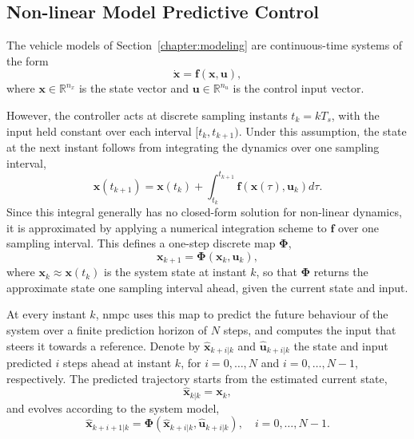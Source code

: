 \subsection{Non-linear Model Predictive Control}
\label{sec:ctrl_nmpc_principles}

The vehicle models of Section~\ref{chapter:modeling} are continuous-time systems of the form
\begin{equation}
    \dot{\mathbf{x}} = \mathbf{f}\left( \mathbf{x}, \mathbf{u} \right),
    \label{eq:nmpc_dynamics_continuous}
\end{equation}
where $\mathbf{x} \in \mathbb{R}^{n_x}$ is the state vector and $\mathbf{u} \in \mathbb{R}^{n_u}$ is the control input vector.

However, the controller acts at discrete sampling instants $t_k = k T_s$, with the input held constant over each interval $[t_k, t_{k+1})$. Under this assumption, the state at the next instant follows from integrating the dynamics over one sampling interval,
\begin{equation}
    \mathbf{x}(t_{k+1}) = \mathbf{x}(t_k) + \int_{t_k}^{t_{k+1}} \mathbf{f}\left( \mathbf{x}(\tau), \mathbf{u}_k \right) d\tau.
    \label{eq:nmpc_dynamics_integral}
\end{equation}
Since this integral generally has no closed-form solution for non-linear dynamics, it is approximated by applying a numerical integration scheme to $\mathbf{f}$ over one sampling interval. This defines a one-step discrete map $\boldsymbol\Phi$,
\begin{equation}
    \mathbf{x}_{k+1} = \boldsymbol\Phi\left( \mathbf{x}_k, \mathbf{u}_k \right),
    \label{eq:nmpc_dynamics_general}
\end{equation}
where $\mathbf{x}_k \approx \mathbf{x}(t_k)$ is the system state at instant $k$, so that $\boldsymbol\Phi$ returns the approximate state one sampling interval ahead, given the current state and input.

At every instant $k$, \gls{nmpc} uses this map to predict the future behaviour of the system over a finite prediction horizon of $N$ steps, and computes the input that steers it towards a reference. Denote by $\hat{\mathbf{x}}_{k+i|k}$ and $\hat{\mathbf{u}}_{k+i|k}$ the state and input predicted $i$ steps ahead at instant $k$, for $i = 0, \dots, N$ and $i = 0, \dots, N-1$, respectively. The predicted trajectory starts from the estimated current state,
\begin{equation}
    \hat{\mathbf{x}}_{k|k} = \mathbf{x}_k,
    \label{eq:nmpc_x0}
\end{equation}
and evolves according to the system model,
\begin{equation}
    \hat{\mathbf{x}}_{k+i+1|k} = \boldsymbol\Phi\left( \hat{\mathbf{x}}_{k+i|k}, \hat{\mathbf{u}}_{k+i|k} \right), \quad i = 0, \dots, N-1.
    \label{eq:nmpc_prediction}
\end{equation}

